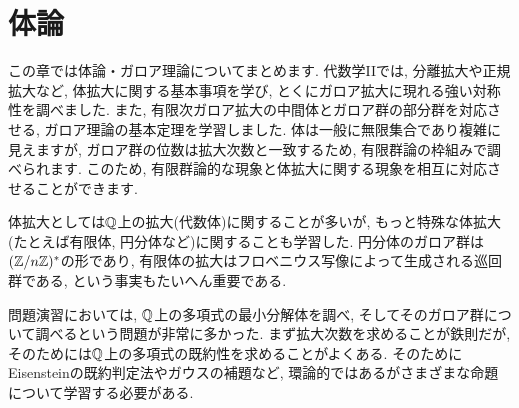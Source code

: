 \chapter{体論}
この章では体論・ガロア理論についてまとめます. 代数学IIでは, 分離拡大や正規拡大など, 体拡大に関する基本事項を学び, とくにガロア拡大に現れる強い対称性を調べました. また, 有限次ガロア拡大の中間体とガロア群の部分群を対応させる, ガロア理論の基本定理を学習しました. 体は一般に無限集合であり複雑に見えますが, ガロア群の位数は拡大次数と一致するため, 有限群論の枠組みで調べられます. このため, 有限群論的な現象と体拡大に関する現象を相互に対応させることができます. \par
体拡大としては$\mathbb{Q}$上の拡大(代数体)に関することが多いが, もっと特殊な体拡大(たとえば有限体, 円分体など)に関することも学習した. 円分体のガロア群は$(\mathbb{Z}/n\mathbb{Z})^{\ast}$の形であり, 有限体の拡大はフロベニウス写像によって生成される巡回群である, という事実もたいへん重要である.
\par
問題演習においては, $\mathbb{Q}$上の多項式の最小分解体を調べ, そしてそのガロア群について調べるという問題が非常に多かった. まず拡大次数を求めることが鉄則だが, そのためには$\mathbb{Q}$上の多項式の既約性を求めることがよくある. そのためにEisensteinの既約判定法やガウスの補題など, 環論的ではあるがさまざまな命題について学習する必要がある.
